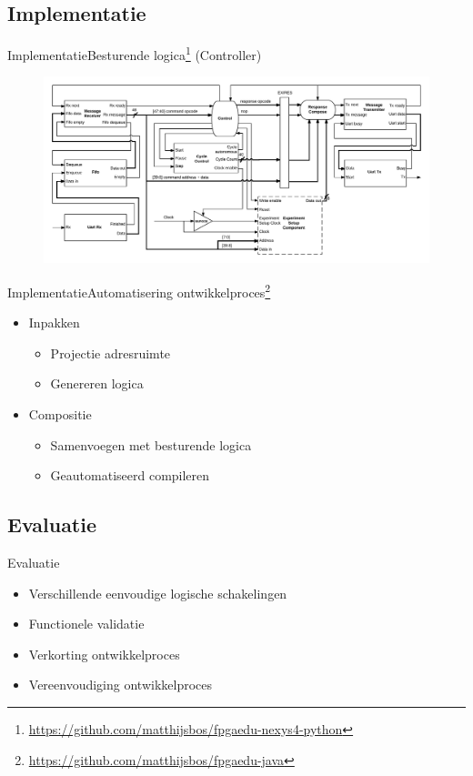 \documentclass{beamer}
\begin{document}
\subsection{Implementatie}
\begin{frame}{Implementatie}{Besturende logica\footnote{\url{https://github.com/matthijsbos/fpgaedu-nexys4-python}} (Controller)}
\begin{figure}[h]
\centering
\includegraphics[width=\textwidth]{img/controller-architecture}
\end{figure}

\end{frame}


\begin{frame}{Implementatie}{Automatisering ontwikkelproces\footnote{\url{https://github.com/matthijsbos/fpgaedu-java}}}

\begin{itemize}
    \item Inpakken
        \begin{itemize}
            \item Projectie adresruimte
            \item Genereren logica
        \end{itemize}
        
    \vspace{1em}
    \item Compositie
        \begin{itemize}
            \item Samenvoegen met besturende logica
            \item Geautomatiseerd compileren
        \end{itemize}        
\end{itemize}
\end{frame}

\subsection{Evaluatie}
\begin{frame}{Evaluatie}
\begin{itemize}
    \item Verschillende eenvoudige logische schakelingen
    \item Functionele validatie
    \item Verkorting ontwikkelproces
    \item Vereenvoudiging ontwikkelproces
\end{itemize}
\end{frame}
\end{document}
